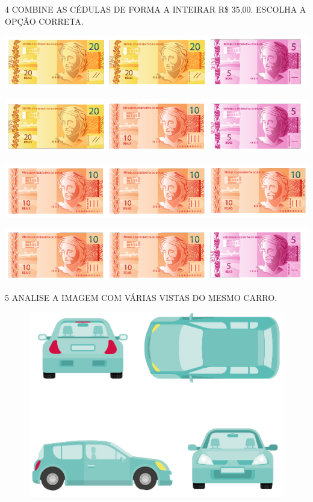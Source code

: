 \pagebreak
\num{4} COMBINE AS CÉDULAS DE FORMA A INTEIRAR R\$ 35,00. ESCOLHA A OPÇÃO CORRETA.

\begin{escolha}
\item \includegraphics[width=\textwidth]{./media/SAEB_1ANO_MAT_FIGURA129a.png}
\item \includegraphics[width=\textwidth]{./media/SAEB_1ANO_MAT_FIGURA129b.png}
\item \includegraphics[width=\textwidth]{./media/SAEB_1ANO_MAT_FIGURA129c.png}
\item \includegraphics[width=\textwidth]{./media/SAEB_1ANO_MAT_FIGURA129d.png}
\end{escolha}

\num{5} ANALISE A IMAGEM COM VÁRIAS VISTAS DO MESMO CARRO.



\begin{figure}[H]
\centering
\includegraphics[width=.6\textwidth]{./media/SAEB_1ANO_MAT_FIGURA130.png}
\end{figure}

